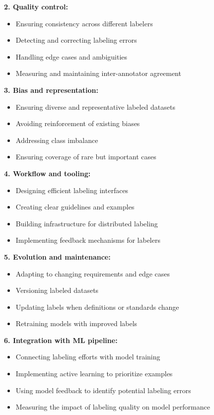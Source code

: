 \documentclass[12pt]{article}
\begin{document}
\begin{enumerate}
\begin{tcolorbox}[colback=blue!5!white,colframe=blue!75!black,title={Solution}]
    \textbf{2. Quality control:}
    \begin{itemize}
        \item Ensuring consistency across different labelers
        \item Detecting and correcting labeling errors
        \item Handling edge cases and ambiguities
        \item Measuring and maintaining inter-annotator agreement
    \end{itemize}
    
    \textbf{3. Bias and representation:}
    \begin{itemize}
        \item Ensuring diverse and representative labeled datasets
        \item Avoiding reinforcement of existing biases
        \item Addressing class imbalance
        \item Ensuring coverage of rare but important cases
    \end{itemize}
    
    \textbf{4. Workflow and tooling:}
    \begin{itemize}
        \item Designing efficient labeling interfaces
        \item Creating clear guidelines and examples
        \item Building infrastructure for distributed labeling
        \item Implementing feedback mechanisms for labelers
    \end{itemize}
    
    \textbf{5. Evolution and maintenance:}
    \begin{itemize}
        \item Adapting to changing requirements and edge cases
        \item Versioning labeled datasets
        \item Updating labels when definitions or standards change
        \item Retraining models with improved labels
    \end{itemize}
    
    \textbf{6. Integration with ML pipeline:}
    \begin{itemize}
        \item Connecting labeling efforts with model training
        \item Implementing active learning to prioritize examples
        \item Using model feedback to identify potential labeling errors
        \item Measuring the impact of labeling quality on model performance
    \end{itemize}
    

\end{tcolorbox}
\end{enumerate}
\end{document}
